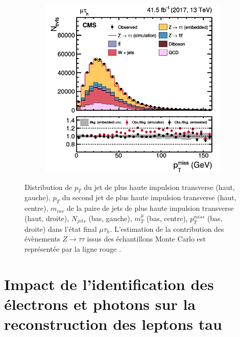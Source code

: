 \begin{figure}[!ht]
\begin{subfigure}[b]{0.33\linewidth}
    \caption*{} 
    \vspace{0.5ex}
  \end{subfigure} 
    \begin{subfigure}[b]{0.33\linewidth}
    \centering
    \includegraphics[width=\linewidth]{Chapitre4/Images/ptmiss_embed.png} 
    \caption*{} 
    \vspace{0.5ex}
  \end{subfigure} 
  \caption{Distribution de $p_T$ du jet de plus haute impulsion transverse (haut, gauche), $p_T$ du second jet de plus haute impulsion transverse (haut, centre), $m_{inv}$ de la paire de jets de plus haute impulsion transverse (haut, droite), $N_{jets}$ (bas, gauche), $m_T^{\mu}$ (bas, centre), $p_T^{miss}$ (bas, droite) dans l'état final $\mu\tau_h$. L'estimation de la contribution des évènements $Z\rightarrow\tau\tau$ issus des échantillons Monte Carlo est représentée par la ligne rouge \cite{Embedding}.}
  \label{embedindata}
\end{figure}
\clearpage
\section{Impact de l'identification des électrons et photons sur la reconstruction des leptons tau}


